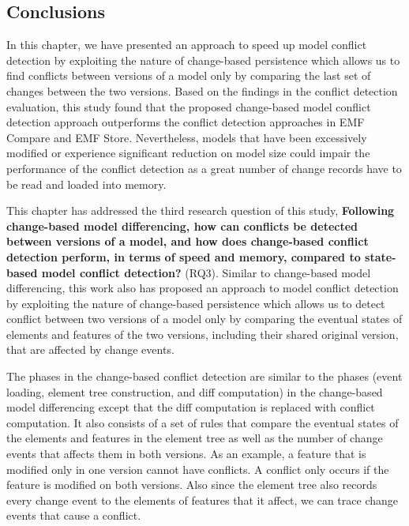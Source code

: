 \subsection{Conclusions}
\label{sec:conclusions_7}
In this chapter, we have presented an approach to speed up model conflict detection by exploiting the nature of change-based persistence which allows us to find conflicts between versions of a model only by comparing the last set of changes between the two versions. Based on the findings in the conflict detection evaluation, this study found that the proposed change-based model conflict detection approach outperforms the conflict detection approaches in EMF Compare and EMF Store. Nevertheless, models that have been excessively modified or experience significant reduction on model size could impair the performance of the conflict detection as a great number of change records have to be read and loaded into memory.

This chapter has addressed the third research question of this study, \textbf{Following change-based model differencing, how can conflicts be detected between versions of a model, and  how does change-based conflict detection perform, in terms of speed and memory, compared to state-based model conflict detection?} (RQ3). Similar to change-based model differencing, this work also has proposed an approach to model conflict detection by exploiting the nature of change-based persistence which allows us to detect conflict between two versions of a model only by comparing the eventual states of elements and features of the two versions, including their shared original version, that are affected by change events.

The phases in the change-based conflict detection are similar to the phases (event loading, element tree construction, and diff computation) in the change-based model differencing except that the diff computation is replaced with conflict computation. It also consists of a set of rules that compare the eventual states of the elements and features in the element tree as well as the number of change events that affects them in both versions. As an example, a feature that is modified only in one version cannot have conflicts. A conflict only occurs if the feature is modified on both versions. Also since the element tree also records every change event to the elements of features that it affect, we can trace change events that cause a conflict.

